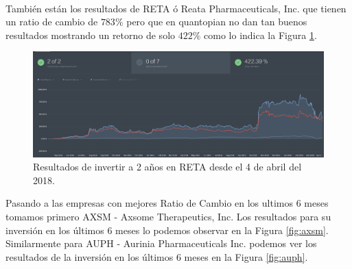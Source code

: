 \documentclass[10pt,a4paper,twocolumn]{article}
\begin{document}
		\\
		También están los resultados de RETA ó Reata Pharmaceuticals, Inc. que tienen un ratio de cambio de $783\% $ pero que en quantopian no dan tan buenos resultados mostrando un retorno de solo $422\% $  como lo indica la Figura \ref{fig:reta}.\\
	
		\begin{figure}
			\centering
			\includegraphics[width=1.0\linewidth]{RETA}
			\caption{Resultados de invertir a 2 años en RETA desde el 4 de abril del 2018.}
			\label{fig:reta}
		\end{figure}
	Pasando a las empresas con mejores Ratio de Cambio en los ultimos 6 meses tomamos primero AXSM - Axsome Therapeutics, Inc.  Los resultados para su inversión en los últimos 6 meses lo podemos observar en la Figura \ref{fig:axsm}. Similarmente para AUPH - Aurinia Pharmaceuticals Inc. podemos ver los resultados de la inversión en los últimos 6 meses en la Figura \ref{fig:auph}.\\
	
\end{document}
